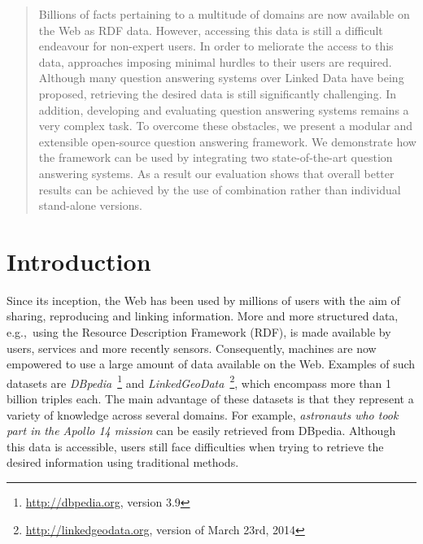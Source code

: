 \documentclass{acm_proc_article-sp}
\begin{document}
\maketitle

\begin{abstract} 
Billions of facts pertaining to a multitude of domains are now available on the Web as RDF data.
However, accessing this data is still a difficult endeavour for non-expert users.
In order to meliorate the access to this data, approaches imposing minimal hurdles to their users are required.
Although many question answering systems over Linked Data have being proposed, retrieving the desired data is still significantly challenging.
In addition, developing and evaluating question answering systems remains a very complex task.
To overcome these obstacles, we present a modular and extensible open-source question answering framework.
We demonstrate how the framework can be used by integrating two state-of-the-art question answering systems.
As a result our evaluation shows that overall better results can be achieved by the use of combination rather than individual stand-alone versions.
\end{abstract}

\section{Introduction}
\label{sec:introduction}

Since its inception, the Web has been used by millions of users with the aim of sharing, reproducing and linking information.
More and more structured data, e.g.,~using the Resource Description Framework (RDF), is made available by users, services and more recently sensors.
Consequently, machines are now empowered to use a large amount of data available on the Web.
Examples of such datasets are \emph{DBpedia}~\cite{dbpedia-swj}\footnote{\url{http://dbpedia.org}, version 3.9} and \emph{LinkedGeoData}~\cite{SLHA11}\footnote{\url{http://linkedgeodata.org}, version of March 23rd, 2014}, which encompass more than 1 billion triples each.
The main advantage of these datasets is that they represent a variety of knowledge across several domains.
For example, \textit{astronauts who took part in the Apollo 14 mission} can be easily retrieved from DBpedia.
Although this data is accessible, users still face difficulties when trying to retrieve the desired information using traditional methods.
\end{document}
